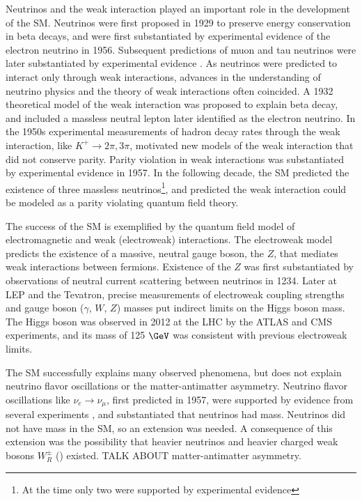 Neutrinos and the weak interaction played an important role in the development of the SM.  
Neutrinos were first proposed in 1929 to preserve energy conservation in beta decays, and were first 
substantiated by experimental evidence \cite{firstNuDiscovery} of the electron neutrino in 1956.  
Subsequent predictions of muon and tau neutrinos were later substantiated 
by experimental evidence \cite{muNuDiscovery,tauNuDiscovery}.  As neutrinos were predicted to interact only through weak 
interactions, advances in the understanding of neutrino physics and the theory of weak interactions often coincided.  
A 1932 theoretical model of the weak interaction was proposed to explain beta decay, and included a massless 
neutral lepton later identified as the electron neutrino.  In the 1950s experimental measurements of 
hadron decay rates through the weak interaction, like $K^{+} \rightarrow 2\pi, 3\pi$, motivated new 
models of the weak interaction that did not conserve parity.  Parity violation in weak interactions was 
substantiated by experimental evidence \cite{weakParityViolation} in 1957.  In the following decade, the 
SM predicted the existence of three massless neutrinos\footnote{At the time only two were supported 
by experimental evidence}, and predicted the weak interaction could be modeled as a parity violating 
quantum field theory.

The success of the SM is exemplified by the quantum field model of electromagnetic and weak (electroweak) 
interactions.  The electroweak model predicts the existence of a massive, neutral gauge boson, the $Z$, 
that mediates weak interactions between fermions.  Existence of the $Z$ was first substantiated by 
observations of neutral current scattering between neutrinos \cite{nuScattering} in 1234.  Later at 
LEP and the Tevatron, precise measurements of electroweak coupling strengths and gauge boson ($\gamma$, $W$, $Z$) 
masses put indirect limits on the Higgs boson mass.  The Higgs boson was observed in 2012 at the LHC 
by the ATLAS and CMS experiments, and its mass\cite{combinedHiggsResult} of 125 $\GeV$ was consistent 
with previous electroweak limits.


The SM successfully explains many observed phenomena, but does not explain neutrino flavor oscillations 
or the matter-antimatter asymmetry.  Neutrino flavor oscillations like $\nu_{e} \rightarrow \nu_{\mu}$, first predicted in 1957, 
were supported by evidence from several experiments \cite{kamiokandeTwo,solarNuSummary,NOvAresults,mainzPhaseIIResults,t2kResults}, and 
substantiated that neutrinos had mass.  Neutrinos did not have mass in the SM, so an extension was needed.  
A consequence of this extension was the possibility that heavier neutrinos \nul and heavier charged weak 
bosons $W^{\pm}_{R}$ (\WR) existed.  TALK ABOUT matter-antimatter asymmetry.

